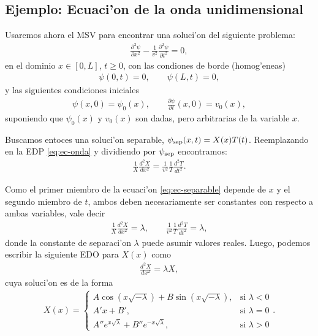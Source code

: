 \subsection{Ejemplo: Ecuaci'on de la onda unidimensional}
Usaremos ahora el MSV para encontrar una soluci'on del siguiente problema:
\begin{align}
\frac{\partial^2 \psi}{\partial x^2}-\frac{1}{v^2}\frac{\partial^2 \psi}{\partial t^2}=0,\label{eq:ec-onda}
\end{align}
en el dominio $x\in[0,L]$, $t\ge 0$, con las condiones de borde (homog'eneas)
\begin{align}
\psi(0,t)=0,\qquad \psi(L,t)=0,\label{eq:cond-borde}
\end{align}
y las siguientes condiciones iniciales 
\begin{align}
\psi(x,0)=\psi_{0}(x),\qquad \frac{\partial \psi}{\partial t}(x,0)=v_{0}(x),\label{eq:cond-inicial}
\end{align}
suponiendo que $\psi_{0}(x)$ y $v_{0}(x)$ son dadas, pero arbitrarias de la variable $x$.


Buscamos entoces una soluci'on separable, $\psi_{\rm sep}(x,t) = X(x)T(t)$. Reemplazando en la EDP \eqref{eq:ec-onda} y dividiendo por $\psi_{\rm sep}$ encontramos:
\begin{align}
\frac{1}{X}\frac{d^2 X}{dx^2}=\frac{1}{v^2}\frac{1}{T}\frac{d^2 T}{dt^2}.\label{eq:ec-separable}
\end{align} 

Como el primer miembro de la ecuaci'on \eqref{eq:ec-separable} depende de $x$ y el segundo miembro de $t$, ambos deben necesariamente ser constantes con respecto a ambas variables, vale decir
\begin{align}
\frac{1}{X}\frac{d^2 X}{dx^2}=\lambda, \qquad \frac{1}{v^2}\frac{1}{T}\frac{d^2 T}{dt^2}=\lambda,
\end{align}
donde la constante de separaci'on $\lambda$ puede asumir valores reales. Luego, podemos escribir la siguiente EDO para $X(x)$ como
\begin{align}
\frac{d^2 X}{dx^2}=\lambda X,
\end{align}
cuya soluci'on es de la forma
\begin{align}
X(x)=
\begin{cases}
A \cos(x\sqrt{-\lambda})+B \sin(x\sqrt{-\lambda}), & \text{si }\lambda<0\\
A' x+B', & \text{si }\lambda=0\\
A'' e^{x\sqrt{\lambda}}+B'' e^{-x\sqrt{\lambda}}, & \text{si }\lambda >0
\end{cases}.
\end{align}

